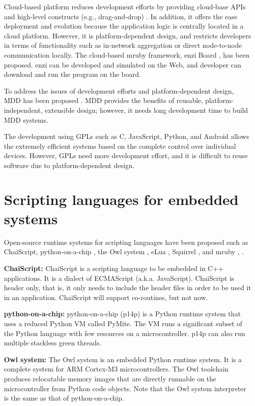 \documentclass[a4j,12pt,oneside,openany,english]{jsbook}
\begin{document}
Cloud-based platform reduces development efforts by providing cloud-base APIs and high-level constructs (e.g., drag-and-drop) \cite{par:cloud-based}.
In addition, it offers the ease deployment and evolution because the application logic is centrally located in a cloud platform.
However, it is platform-dependent design, and restricts developers in terms of functionality such as in-network aggregation or direct node-to-node communication locally.
The cloud-based mruby framework, enzi Board \cite{url:enzi}, has been proposed.
enzi can be developed and simulated on the Web, and developer can download and run the program on the board.

To address the issues of development efforts and platform-dependent design, MDD has been proposed \cite{par:MDD}.
MDD provides the benefits of reusable, platform-independent, extensible design; however, it needs long development time to build MDD systems.

The development using GPLs such as C, JavaScript, Python, and Android allows the extremely efficient systems based on the complete control over individual devices.
However, GPLs need more development effort, and it is difficult to reuse software due to platform-dependent design.

\section{Scripting languages for embedded systems}

Open-source runtime systems for scripting languages have been proposed such as ChaiScript\cite{url:ChaiScript}, python-on-a-chip \cite{url:python-on-a-chip}, the Owl system \cite{par:owl}, eLua \cite{url:eLua}, Squirrel \cite{url:Squirrel}, and mruby \cite{par:mruby}, \cite{url:mruby}.

{\bf ChaiScript:}
ChaiScript is a scripting language to be embedded in C++ applications.
It is a dialect of ECMAScript (a.k.a. JavaScript).
ChaiScript is header only, that is, it only needs to include the header files in order to be used it in an application.
ChaiScript will support co-routines, but not now. 

{\bf python-on-a-chip:}
python-on-a-chip (p14p) is a Python runtime system that uses a reduced Python VM called PyMite.
The VM runs a significant subset of the Python language with few resources on a microcontroller.
p14p can also run multiple stackless green threads.

{\bf Owl system:}
The Owl system is an embedded Python runtime system.
It is a complete system for ARM Cortex-M3 microcontrollers.
The Owl toolchain produces relocatable memory images that are directly runnable on the microcontroller from Python code objects.
Note that the Owl system interpreter is the same as that of python-on-a-chip.
\end{document}
